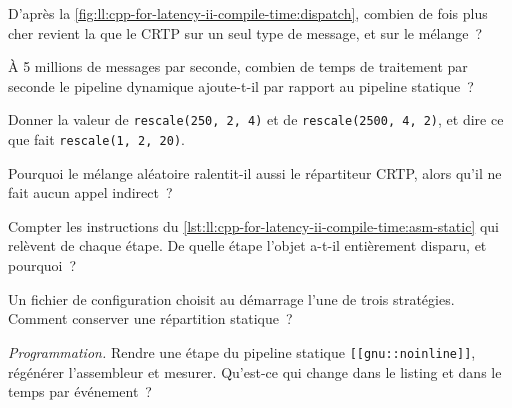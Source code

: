 \begin{exercise}[$\star$]\label{exo:ll:cpp-for-latency-ii-compile-time:1}
D'après la \cref{fig:ll:cpp-for-latency-ii-compile-time:dispatch}, combien de fois plus cher revient la  que le CRTP sur un
seul type de message, et sur le mélange~?
\end{exercise}

\begin{exercise}[$\star$]\label{exo:ll:cpp-for-latency-ii-compile-time:2}
À 5 millions de messages par seconde, combien de temps de traitement par seconde le pipeline dynamique ajoute-t-il par rapport au pipeline statique~?
\end{exercise}

\begin{exercise}[$\star$]\label{exo:ll:cpp-for-latency-ii-compile-time:3}
Donner la valeur de \texttt{rescale(250, 2, 4)} et de \texttt{rescale(2500, 4, 2)}, et dire ce que fait
\texttt{rescale(1, 2, 20)}.
\end{exercise}

\begin{exercise}[$\star\star$]\label{exo:ll:cpp-for-latency-ii-compile-time:4}
Pourquoi le mélange aléatoire ralentit-il aussi le répartiteur CRTP, alors qu'il ne fait aucun appel indirect~?
\end{exercise}

\begin{exercise}[$\star\star$]\label{exo:ll:cpp-for-latency-ii-compile-time:5}
Compter les instructions du \cref{lst:ll:cpp-for-latency-ii-compile-time:asm-static} qui relèvent de chaque étape. De quelle étape
l'objet a-t-il entièrement disparu, et pourquoi~?
\end{exercise}

\begin{exercise}[$\star\star$]\label{exo:ll:cpp-for-latency-ii-compile-time:6}
Un fichier de configuration choisit au démarrage l'une de trois stratégies. Comment conserver une répartition statique~?
\end{exercise}

\begin{exercise}[$\star\star\star$]\label{exo:ll:cpp-for-latency-ii-compile-time:7}
\emph{Programmation.} Rendre une étape du pipeline statique \texttt{[[gnu::noinline]]}, régénérer l'assembleur et mesurer. Qu'est-ce qui
change dans le listing et dans le temps par événement~?
\end{exercise}

